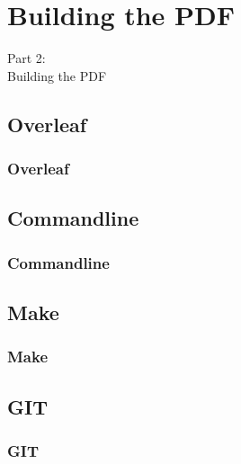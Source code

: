 {
\renewcommand{\bgcolor}{building}

\section{Building the PDF}
\begin{frame}
  \vspace{25mm}
  \begin{center}
    \Huge{Part 2:\\Building the PDF}
  \end{center}
\end{frame}

\subsection{Overleaf}
\begin{frame}[fragile]
  \frametitle{Overleaf}
  \vspace{3mm}
  
\end{frame}

\subsection{Commandline}
\begin{frame}[fragile]
  \frametitle{Commandline}
  \vspace{3mm}
  
\end{frame}

\subsection{Make}
\begin{frame}[fragile]
  \frametitle{Make}
  \vspace{3mm}
  
\end{frame}

\subsection{GIT}
\begin{frame}[fragile]
  \frametitle{GIT}
  \vspace{3mm}
  
\end{frame}

}

